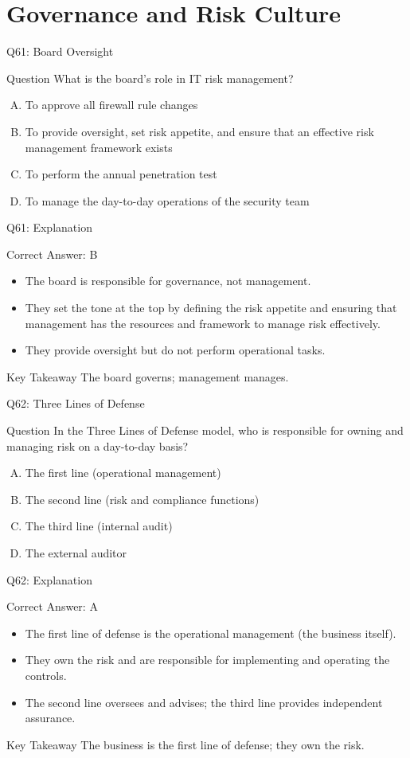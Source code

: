 \documentclass[aspectratio=169]{beamer}
\newcommand{\hq}[7]{%
	\begin{frame}{Q#1: #2}
		\begin{block}{Question}
			#3
		\end{block}
		\begin{enumerate}[(A)]
			#4
		\end{enumerate}
	\end{frame}
	\begin{frame}{Q#1: Explanation}
		\begin{block}{Correct Answer: #5}
			\begin{itemize}
				#6
			\end{itemize}
		\end{block}
		\begin{alertblock}{Key Takeaway}
			#7
		\end{alertblock}
	\end{frame}
}
\begin{document}
	\section{Governance and Risk Culture}
	
	\hq{61}{Board Oversight}
	{What is the board's role in IT risk management?}
	{\item To approve all firewall rule changes
		\item To provide oversight, set risk appetite, and ensure that an effective risk management framework exists
		\item To perform the annual penetration test
		\item To manage the day-to-day operations of the security team}
	{B}
	{\item The board is responsible for governance, not management.
		\item They set the tone at the top by defining the risk appetite and ensuring that management has the resources and framework to manage risk effectively.
		\item They provide oversight but do not perform operational tasks.}
	{The board governs; management manages.}
	
	\hq{62}{Three Lines of Defense}
	{In the Three Lines of Defense model, who is responsible for owning and managing risk on a day-to-day basis?}
	{\item The first line (operational management)
		\item The second line (risk and compliance functions)
		\item The third line (internal audit)
		\item The external auditor}
	{A}
	{\item The first line of defense is the operational management (the business itself).
		\item They own the risk and are responsible for implementing and operating the controls.
		\item The second line oversees and advises; the third line provides independent assurance.}
	{The business is the first line of defense; they own the risk.}
	
\end{document}
